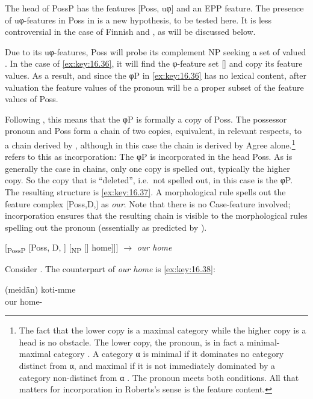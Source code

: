 \documentclass[output=paper]{langsci/langscibook}
\begin{document}
The head of PossP has the features [Poss, uφ] and an \gls{EPP} feature. The presence of uφ-features in Poss in 
is a new hypothesis, to be tested here. It is less controversial in the case of
Finnish and , as will be discussed below.

Due to its uφ-features, Poss will probe its complement NP seeking a set of
valued . In the case of \eqref{ex:key:16.36}, it will find the φ-feature set [\Fpl{}]
and copy its feature values. As a result, and since the φP in \eqref{ex:key:16.36} has no
lexical content, after valuation the feature values of the pronoun will be a
proper subset of the feature values of Poss.

Following \textcite{Roberts2010,Roberts2010b}, this means that the φP is formally a copy of Poss.
The possessor pronoun and Poss form a chain of two copies, equivalent, in
relevant respects, to a chain derived by , although in this case the
chain is derived by Agree alone.\footnote{The fact that the lower copy is a
    maximal category while the higher copy is a head is no obstacle. The lower
    copy, the pronoun, is in fact a minimal-maximal category
    \citep[249]{Chomsky1995}. A category α is minimal if it dominates no
    category distinct from α, and maximal if it is not immediately
    dominated by a category non-distinct from α
    \citep[54--56]{Roberts2010}. The pronoun meets both conditions. All that
matters for incorporation in Roberts’s sense is the feature
content.\label{fn:16.19}} \textcite{Roberts2010,Roberts2010b} refers to this as incorporation: The φP is incorporated in the head
Poss. As is generally the case in chains, only one copy is spelled out,
typically the higher copy. So the copy that is \enquote{deleted}, i.e.\  not
spelled out, in this case is the φP. The resulting structure is
\eqref{ex:key:16.37}. A morphological rule spells out the feature complex
[Poss,D,\Fpl{}] as \emph{our}. Note that there is no Case-feature involved;
incorporation ensures that the resulting chain is visible to the morphological
rules spelling out the pronoun (essentially as predicted by
\citealt[117--119]{Baker1988}).

\ea\label{ex:key:16.37}
    {}[\textsubscript{PossP} [Poss, D, \Fpl{}] [\textsubscript{NP} [\sout{\Fpl}]
        home]]] $\rightarrow$ \emph{our home}
\z

Consider . The counterpart of \emph{our home} is \eqref{ex:key:16.38}:

\ea\label{ex:key:16.38} 
    \sn
    \gll (meidän) koti-mme\\
        \hphantom{(}our home-\Fpl{}\\
\z
\end{document}
